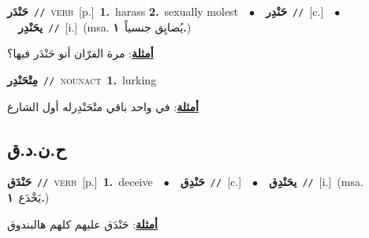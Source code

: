 \documentclass[10pt,a4paper,twoside]{article} %
\begin{document}
\begin{multicols}{2}
{\setlength\topsep{0pt}\textbf{\foreignlanguage{arabic}{حَنْدَر}}\ {\color{gray}\texttt{//}\color{black}}\ \textsc{verb}\ [p.]\ \textbf{1.}~harass  \textbf{2.}~sexually molest\ \ $\bullet$\ \ \setlength\topsep{0pt}\textbf{\foreignlanguage{arabic}{حَنْدِر}}\ {\color{gray}\texttt{//}\color{black}}\ [c.]\ \ $\bullet$\ \ \setlength\topsep{0pt}\textbf{\foreignlanguage{arabic}{يحَنْدِر}}\ {\color{gray}\texttt{//}\color{black}}\ [i.]\ \color{gray}(msa. \foreignlanguage{arabic}{يُضايِق جنسياً}~\foreignlanguage{arabic}{\textbf{١.}})\color{black}\  \begin{flushright}\color{gray}\foreignlanguage{arabic}{\textbf{\underline{\foreignlanguage{arabic}{أمثلة}}}: مرة الفرّان أنو حَنْدَر فيها؟}\end{flushright}\color{black}} \vspace{2mm}

{\setlength\topsep{0pt}\textbf{\foreignlanguage{arabic}{مِتْحَنْدِر}}\ {\color{gray}\texttt{//}\color{black}}\ \textsc{noun\textunderscore act}\ \textbf{1.}~lurking\  \begin{flushright}\color{gray}\foreignlanguage{arabic}{\textbf{\underline{\foreignlanguage{arabic}{أمثلة}}}: في واحد باقي متْحَنْدِرله أول الشارع}\end{flushright}\color{black}} \vspace{2mm}

\vspace{-3mm}
\subsection*{\color{blue}\foreignlanguage{arabic}{ح.ن.د.ق}\color{blue}{}} 

{\setlength\topsep{0pt}\textbf{\foreignlanguage{arabic}{حَنْدَق}}\ {\color{gray}\texttt{//}\color{black}}\ \textsc{verb}\ [p.]\ \textbf{1.}~deceive\ \ $\bullet$\ \ \setlength\topsep{0pt}\textbf{\foreignlanguage{arabic}{حَنْدِق}}\ {\color{gray}\texttt{//}\color{black}}\ [c.]\ \ $\bullet$\ \ \setlength\topsep{0pt}\textbf{\foreignlanguage{arabic}{يحَنْدِق}}\ {\color{gray}\texttt{//}\color{black}}\ [i.]\ \color{gray}(msa. \foreignlanguage{arabic}{يَخْدَع}~\foreignlanguage{arabic}{\textbf{١.}})\color{black}\  \begin{flushright}\color{gray}\foreignlanguage{arabic}{\textbf{\underline{\foreignlanguage{arabic}{أمثلة}}}: حَنْدَق عليهم كلهم هالبندوق}\end{flushright}\color{black}} \vspace{2mm}


\end{multicols}
\end{document}
